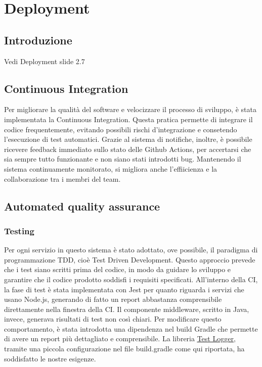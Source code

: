 
\chapter{Deployment}
\label{ch:deployment} %

\section{Introduzione}
Vedi Deployment slide 2.7

\section{Continuous Integration}
Per migliorare la qualità del software e velocizzare il processo di sviluppo, è stata implementata la Continuous Integration.
Questa pratica permette di integrare il codice frequentemente, evitando possibili rischi d'integrazione e consetendo 
l'esecuzione di test automatici. Grazie al sistema di notifiche, inoltre, è possibile ricevere feedback immediato sullo stato delle Github Actions,
per accertarsi che sia sempre tutto funzionante e non siano stati introdotti bug. Mantenendo il sistema continuamente monitorato,
si migliora anche l'effiicienza e la collaborazione tra i membri del team.

\section{Automated quality assurance}
\subsection{Testing}

Per ogni servizio in questo sistema è stato adottato, ove possibile, il paradigma di programmazione TDD, cioè Test Driven Development. Questo approccio prevede che i test siano scritti prima del codice, in modo da guidare lo sviluppo e garantire che il codice prodotto soddisfi i requisiti specificati.
All'interno della CI, la fase di test è stata implementata con Jest per quanto riguarda i servizi che usano Node.js, generando di fatto un report abbastanza comprensibile direttamente nella finestra della CI. Il componente middleware, scritto in Java, invece, generava risultati di test non così chiari. Per modificare questo comportamento, è stata introdotta una dipendenza nel build Gradle che permette di avere un report più dettagliato e comprensibile. 
La libreria \href{https://plugins.gradle.org/plugin/com.adarshr.test-logger}{\underline{Test Logger}}, tramite una piccola configurazione nel file build.gradle come qui riportata, ha soddisfatto le nostre esigenze.

